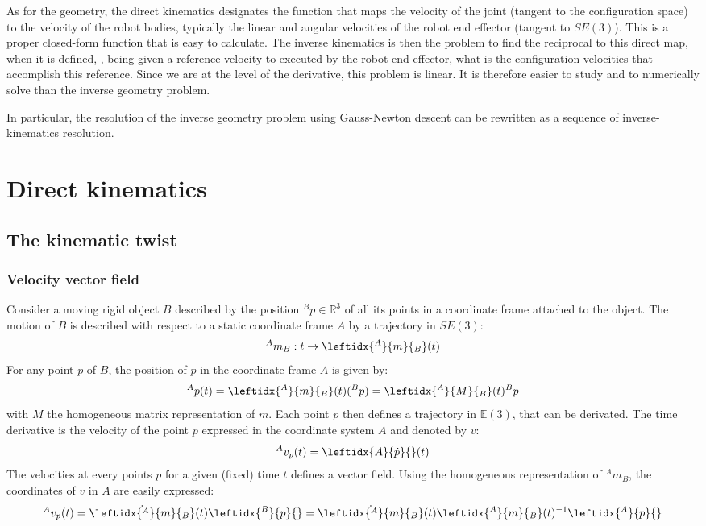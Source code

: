 \documentclass{book}
\begin{document}
As for the geometry, the direct kinematics designates the function that maps the velocity of the joint (tangent to the configuration space) to the velocity of the robot bodies, typically the linear and angular velocities of the robot end effector (tangent to $SE(3)$). This is a proper closed-form function that is easy to calculate. The inverse kinematics is then the problem to find the reciprocal to this direct map, when it is defined, \mie, being given a reference velocity to executed by the robot end effector, what is the configuration velocities that accomplish this reference. Since we are at the level of the derivative, this problem is linear. It is therefore easier to study and to numerically solve than the inverse geometry problem. 

In particular, the resolution of the inverse geometry problem using Gauss-Newton descent can be rewritten as a sequence of inverse-kinematics resolution. 


\chapter{Direct kinematics}

\section{The kinematic twist}

\subsection{Velocity vector field}

Consider a moving rigid object $B$ described by the position $^Bp \in \mathbb{R}^3$  of all its points in a coordinate frame attached to the object. The motion of $B$ is described with respect to a static coordinate frame $A$ by a trajectory in $SE(3)$:
$$ ^Am_B: t \rightarrow \leftidx{^A}{m}{_B}(t) $$
For any point $p$ of $B$, the position of $p$ in the coordinate frame $A$ is given by:
$$ ^Ap(t) = \leftidx{^A}{m}{_B}(t) (^Bp) = \leftidx{^A}{M}{_B}(t) ^Bp $$
with $M$ the homogeneous matrix representation of $m$. Each point $p$ then defines a trajectory in $\mathbb{E}(3)$, that can be derivated. The time derivative is the velocity of the point $p$ expressed in the coordinate system $A$ and denoted by $v$:
$$ ^Av_p(t) =  \leftidx{A}{\dot p}{}(t) $$
The velocities at every points $p$ for a given (fixed) time $t$ defines a vector field. Using the homogeneous representation of $^Am_B$, the coordinates of $v$ in $A$ are easily expressed:
$$ ^Av_p(t) = \dot{ \leftidx{^A}{m}{_B}}(t) \leftidx{^B}{p}{} =  \dot{ \leftidx{^A}{m}{_B}}(t) \leftidx{^A}{m}{_B}(t)^{-1} \leftidx{^A}{p}{}$$
\end{document}
